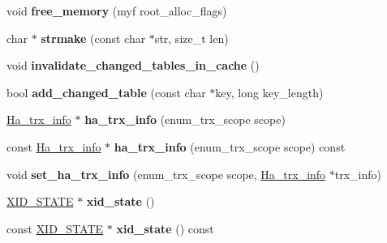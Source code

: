 \begin{DoxyCompactItemize}
\mbox{\label{classTransaction__ctx_ab19b986eab6f36f0ccf552ba0bfd0cea}} 
void {\bfseries free\+\_\+memory} (myf root\+\_\+alloc\+\_\+flags)
\item 
\mbox{\label{classTransaction__ctx_aff1765c775b81e0a0f2e222da536e275}} 
char $\ast$ {\bfseries strmake} (const char $\ast$str, size\+\_\+t len)
\item 
\mbox{\label{classTransaction__ctx_a793e2f3ee3ca6eea1df99ce1a2cf9c1b}} 
void {\bfseries invalidate\+\_\+changed\+\_\+tables\+\_\+in\+\_\+cache} ()
\item 
\mbox{\label{classTransaction__ctx_add2ebf6b181014f61ad4b4daf1532b9c}} 
bool {\bfseries add\+\_\+changed\+\_\+table} (const char $\ast$key, long key\+\_\+length)
\item 
\mbox{\label{classTransaction__ctx_aef6dad79135914a642d7d08c47e6a69b}} 
\mbox{\hyperlink{classHa__trx__info}{Ha\+\_\+trx\+\_\+info}} $\ast$ {\bfseries ha\+\_\+trx\+\_\+info} (enum\+\_\+trx\+\_\+scope scope)
\item 
\mbox{\label{classTransaction__ctx_a6175b3fbe070bd2ad7b514399518f2f3}} 
const \mbox{\hyperlink{classHa__trx__info}{Ha\+\_\+trx\+\_\+info}} $\ast$ {\bfseries ha\+\_\+trx\+\_\+info} (enum\+\_\+trx\+\_\+scope scope) const
\item 
\mbox{\label{classTransaction__ctx_af7779f2b6b1cd79ddda7a9a9eb49a06b}} 
void {\bfseries set\+\_\+ha\+\_\+trx\+\_\+info} (enum\+\_\+trx\+\_\+scope scope, \mbox{\hyperlink{classHa__trx__info}{Ha\+\_\+trx\+\_\+info}} $\ast$trx\+\_\+info)
\item 
\mbox{\label{classTransaction__ctx_a12d03b724c232b34fdab9f8e07a48108}} 
\mbox{\hyperlink{classXID__STATE}{X\+I\+D\+\_\+\+S\+T\+A\+TE}} $\ast$ {\bfseries xid\+\_\+state} ()
\item 
\mbox{\label{classTransaction__ctx_a4f8872139ca78935140054c315aed5e0}} 
const \mbox{\hyperlink{classXID__STATE}{X\+I\+D\+\_\+\+S\+T\+A\+TE}} $\ast$ {\bfseries xid\+\_\+state} () const

\end{DoxyCompactItemize}
